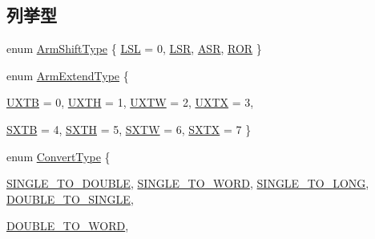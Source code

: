 \subsection*{列挙型}
\begin{DoxyCompactItemize}
\item 
enum \hyperlink{namespaceArmISA_a209d79feaaef0aa2f54ae62e53ee90de}{ArmShiftType} \{ \hyperlink{namespaceArmISA_a209d79feaaef0aa2f54ae62e53ee90dea0226b11632995cf028f321326046753e}{LSL} =  0, 
\hyperlink{namespaceArmISA_a209d79feaaef0aa2f54ae62e53ee90dea298da67ff8599a09829a91ad0ad3069b}{LSR}, 
\hyperlink{namespaceArmISA_a209d79feaaef0aa2f54ae62e53ee90deaf84b730277d260fd0ff17ce3ec05ed5d}{ASR}, 
\hyperlink{namespaceArmISA_a209d79feaaef0aa2f54ae62e53ee90dea7b369e7350ac1a6585413ed60a0d6e10}{ROR}
 \}
\item 
enum \hyperlink{namespaceArmISA_a4420842b5673543552a3aba317c69dbb}{ArmExtendType} \{ \par
\hyperlink{namespaceArmISA_a4420842b5673543552a3aba317c69dbbab2623244892c79a371024236545eafc1}{UXTB} =  0, 
\hyperlink{namespaceArmISA_a4420842b5673543552a3aba317c69dbba7763cb71589a367d4a741bb0370cad6a}{UXTH} =  1, 
\hyperlink{namespaceArmISA_a4420842b5673543552a3aba317c69dbba0a7573a5be6b18780b516eaed391a1ec}{UXTW} =  2, 
\hyperlink{namespaceArmISA_a4420842b5673543552a3aba317c69dbbae7544cdb87e43f632eb94b3905c72224}{UXTX} =  3, 
\par
\hyperlink{namespaceArmISA_a4420842b5673543552a3aba317c69dbba31f69e68ddcc1d88f504cda2f7310e81}{SXTB} =  4, 
\hyperlink{namespaceArmISA_a4420842b5673543552a3aba317c69dbbaa694a8ac9ed3f09101864b42096bc47a}{SXTH} =  5, 
\hyperlink{namespaceArmISA_a4420842b5673543552a3aba317c69dbba94e14db157d50511f2cf0246e0bacafe}{SXTW} =  6, 
\hyperlink{namespaceArmISA_a4420842b5673543552a3aba317c69dbbab5a1b7ff9434755e99be6e0aa3721b74}{SXTX} =  7
 \}
\item 
enum \hyperlink{namespaceArmISA_a3eb2ef7126c12e67d97d307c7aaa381d}{ConvertType} \{ \par
\hyperlink{namespaceArmISA_a3eb2ef7126c12e67d97d307c7aaa381da688991f912f8a5b9eb0060417b4bb5c5}{SINGLE\_\-TO\_\-DOUBLE}, 
\hyperlink{namespaceArmISA_a3eb2ef7126c12e67d97d307c7aaa381dac8c56c77e4188dbbec8f186f64ee9412}{SINGLE\_\-TO\_\-WORD}, 
\hyperlink{namespaceArmISA_a3eb2ef7126c12e67d97d307c7aaa381da576ab639087384a72f7a814fa1bedb45}{SINGLE\_\-TO\_\-LONG}, 
\hyperlink{namespaceArmISA_a3eb2ef7126c12e67d97d307c7aaa381dadb2d1f35b1e88dd6d9e5e6808aabcef1}{DOUBLE\_\-TO\_\-SINGLE}, 
\par
\hyperlink{namespaceArmISA_a3eb2ef7126c12e67d97d307c7aaa381da4a7f360abf73debe1a77c90b540b2e89}{DOUBLE\_\-TO\_\-WORD}, 

\end{DoxyCompactItemize}
